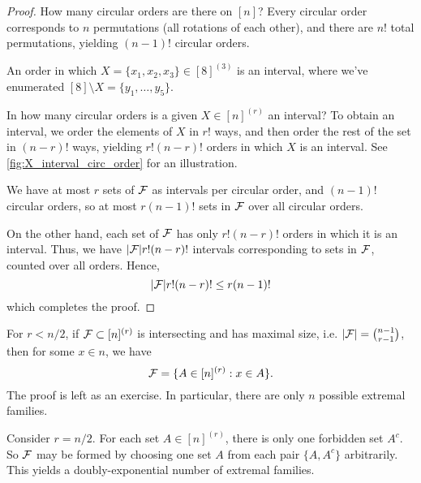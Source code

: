 \begin{proof}
How many circular orders are there on $[n]$? Every circular order corresponds to $n$ permutations (all rotations of each other), and there are $n!$ total permutations, yielding $(n-1)!$ circular orders.

\begin{marginfigure}
\begin{center}
\end{center}
\caption{An order in which $X = \{x_1,x_2,x_3\} \in [8]^{(3)}$ is an interval, where we've enumerated $[8]\setminus X = \{y_1,\dotsc,y_5\}$.} \label{fig:X_interval_circ_order}
\end{marginfigure}
In how many circular orders is a given $X\in [n]^{(r)}$ an interval? To obtain an interval, we order the elements of $X$ in $r!$ ways, and then order the rest of the set in $(n-r)!$ ways, yielding $r!(n-r)!$ orders in which $X$ is an interval. See \cref{fig:X_interval_circ_order} for an illustration. 

We have at most $r$ sets of $\mathcal{F}$ as intervals per circular order, and $(n-1)!$ circular orders, so at most $r(n-1)!$ sets in $\mathcal{F}$ over all circular orders.

On the other hand, each set of $\mathcal{F}$ has only $r!(n-r)!$ orders in which it is an interval. Thus, we have $|\mathcal{F}| r!(n-r)!$ intervals corresponding to sets in $\mathcal{F}$, counted over all orders. Hence,
\[
|\mathcal{F}| r! (n-r)! \leq r(n-1)! 
\]
which completes the proof.
\end{proof}

\begin{remark}
For $r < n/2$, if $\mathcal{F}\subset [n]^{(r)}$ is intersecting and has maximal size, i.e. $|\mathcal{F}| = {n-1\choose r-1}$, then for some $x\in n$, we have
\[
\mathcal{F} = \{A\in [n]^{(r)}: x\in A \}.
\]
The proof is left as an exercise. In particular, there are only $n$ possible extremal families.

Consider $r=n/2$. For each set $A \in [n]^{(r)}$, there is only one forbidden set $A^c$. So $\mathcal{F}$ may be formed by choosing one set $A$ from each pair $\{A,A^c\}$ arbitrarily. This yields a doubly-exponential number of extremal families.
\end{remark}

